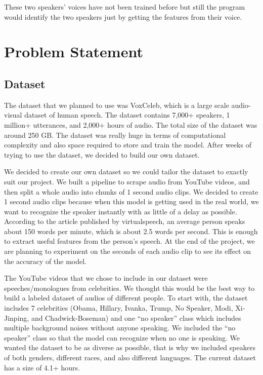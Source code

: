 \documentclass[10pt,twocolumn,letterpaper]{article}
\begin{document}
These two speakers’ voices have not been trained before but still the program would identify the two speakers just by getting the features from their voice. 

\section{Problem Statement}

\subsection{Dataset}

The dataset that we planned to use was VoxCeleb, which is a large scale audio-visual dataset of human speech. The dataset contains 7,000+ speakers, 1 million+ utterances, and 2,000+ hours of audio. The total size of the dataset was around 250 GB. The dataset was really huge in terms of computational complexity and also space required to store and train the model. After weeks of trying to use the dataset, we decided to build our own dataset. 

We decided to create our own dataset so we could tailor the dataset to exactly suit our project. We built a pipeline to scrape audio from YouTube videos, and then split a whole audio into chunks of 1 second audio clips. We decided to create 1 second audio clips because when this model is getting used in the real world, we want to recognize the speaker instantly with as little of a delay as possible. According to the article \cite{Barnard} published by virtualspeech, an average person speaks about 150 words per minute, which is about 2.5 words per second. This is enough to extract useful features from the person’s speech. At the end of the project, we are planning to experiment on the seconds of each audio clip to see its effect on the accuracy of the model. 


The YouTube videos that we chose to include in our dataset were speeches/monologues from celebrities. We thought this would be the best way to build a labeled dataset of audios of different people. To start with, the dataset includes 7 celebrities (Obama, Hillary, Ivanka, Trump, No Speaker, Modi, Xi-Jinping, and Chadwick-Boseman) and one “no speaker” class which includes multiple background noises without anyone speaking. We included the “no speaker” class so that the model can recognize when no one is speaking.  We wanted the dataset to be as diverse as possible, that is why we included speakers of both genders, different races, and also different languages. The current dataset has a size of 4.1+ hours. 
\end{document}
